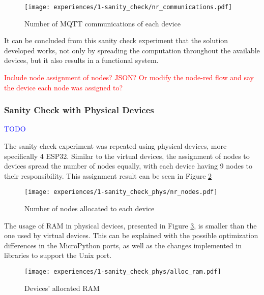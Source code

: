 \begin{figure}[H]
\centering
\texttt{[image: experiences/1-sanity\_check/nr\_communications.pdf]}
\caption[Number of MQTT communications of each device]{Number of MQTT communications of each device}\label{fig:sanity_nr_communications}
\end{figure}

It can be concluded from this sanity check experiment that the solution developed works, not only by spreading the computation throughout the available devices, but it also results in a functional system.

\textcolor{red}{Include node assignment of nodes? JSON? Or modify the node-red flow and say the device each node was assigned to?}


\subsubsection{Sanity Check with Physical Devices}

\textcolor{blue}{TODO}

The sanity check experiment was repeated using physical devices, more specifically 4 ESP32. Similar to the virtual devices, the assignment of nodes to devices spread the number of nodes equally, with each device having 9 nodes to their responsibility. This assignment result can be seen in Figure \ref{fig:sanity_check_phys_nr_nodes}

\begin{figure}[h]
\centering
\texttt{[image: experiences/1-sanity\_check\_phys/nr\_nodes.pdf]}
\caption[Number of nodes allocated to each device]{Number of nodes allocated to each device}\label{fig:sanity_check_phys_nr_nodes}
\end{figure}

The usage of RAM in physical devices, presented in Figure \ref{fig:sanity_check_phys_alloc_ram}, is smaller than the one used by virtual devices. This can be explained with the possible optimization differences in the MicroPython ports, as well as the changes implemented in libraries to support the Unix port.
    
\begin{figure}[h]
\centering
\texttt{[image: experiences/1-sanity\_check\_phys/alloc\_ram.pdf]}
\caption[Devices' allocated RAM]{Devices' allocated RAM}\label{fig:sanity_check_phys_alloc_ram}
\end{figure}

